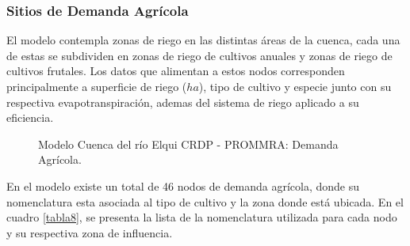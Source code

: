 \documentclass[11pt,]{article}
\begin{document}
\subsubsection{Sitios de Demanda Agrícola}\bigskip

El modelo contempla zonas de riego en las distintas áreas de la cuenca, cada una de estas se subdividen en zonas de riego de cultivos anuales y zonas de riego de cultivos frutales. Los datos que alimentan a estos nodos corresponden principalmente a superficie de riego ($ha$), tipo de cultivo y especie junto con su respectiva evapotranspiración, ademas del sistema de riego aplicado a su eficiencia. \\


\begin{figure}[H]
\begin{center}
\caption{Modelo Cuenca del río Elqui CRDP - PROMMRA: Demanda Agrícola.}
\label{etiqueta_figura11}
\end{center}
\end{figure}

En el modelo existe un total de 46 nodos de demanda agrícola, donde su nomenclatura esta asociada al tipo de cultivo y la zona donde está ubicada. En el cuadro \ref{tabla8}, se presenta la lista de la nomenclatura utilizada para cada nodo y su respectiva zona de influencia.
\end{document}
